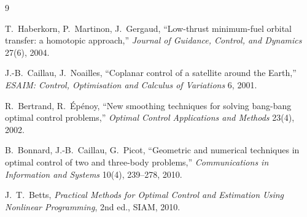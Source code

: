 \documentclass[11pt]{article}
\begin{document}
\begin{thebibliography}{9}

T.~Haberkorn, P.~Martinon, J.~Gergaud,
``Low-thrust minimum-fuel orbital transfer: a homotopic approach,''
\emph{Journal of Guidance, Control, and Dynamics} 27(6), 2004.

J.-B.~Caillau, J.~Noailles,
``Coplanar control of a satellite around the Earth,''
\emph{ESAIM: Control, Optimisation and Calculus of Variations} 6, 2001.

R.~Bertrand, R.~\'Ep\'enoy,
``New smoothing techniques for solving bang-bang optimal control problems,''
\emph{Optimal Control Applications and Methods} 23(4), 2002.

B.~Bonnard, J.-B.~Caillau, G.~Picot,
``Geometric and numerical techniques in optimal control of two and
three-body problems,''
\emph{Communications in Information and Systems} 10(4), 239--278, 2010.

J.~T.~Betts,
\emph{Practical Methods for Optimal Control and Estimation Using Nonlinear
Programming}, 2nd ed., SIAM, 2010.

\end{thebibliography}
\end{document}
